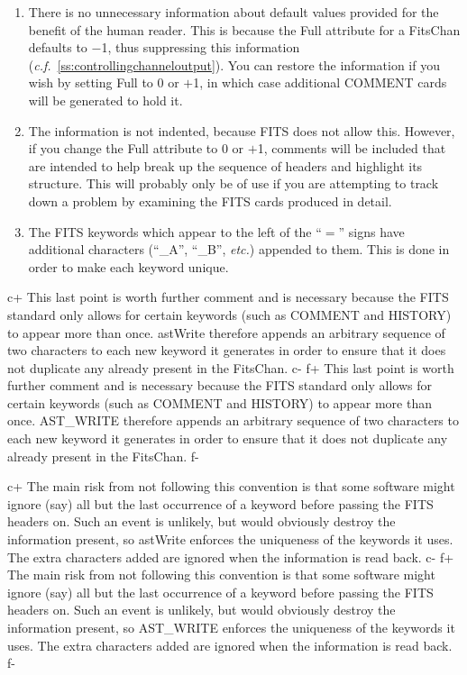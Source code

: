 \documentclass[twoside,11pt]{article}
\newcommand{\secref}[1]{\S\ref{#1}}
\renewcommand{\secref}[1]{\ref{#1}}
\begin{document}
\begin{enumerate}
\item There is no unnecessary information about default values
provided for the benefit of the human reader. This is because the Full
attribute for a FitsChan defaults to $-$1, thus suppressing this
information ({\em{c.f.}}~\secref{ss:controllingchanneloutput}). You
can restore the information if you wish by setting Full to 0 or $+$1,
in which case additional COMMENT cards will be generated to hold it.

\item The information is not indented, because FITS does not allow
this. However, if you change the Full attribute to 0 or $+$1, comments
will be included that are intended to help break up the sequence of
headers and highlight its structure. This will probably only be of use
if you are attempting to track down a problem by examining the FITS
cards produced in detail.

\item The FITS keywords which appear to the left of the ``$=$'' signs
have additional characters (``\_A'', ``\_B'', {\em{etc.}}) appended to
them. This is done in order to make each keyword unique.
\end{enumerate}

c+
This last point is worth further comment and is necessary because the
FITS standard only allows for certain keywords (such as COMMENT and
HISTORY) to appear more than once. astWrite therefore appends an
arbitrary sequence of two characters to each new keyword it generates
in order to ensure that it does not duplicate any already present in
the FitsChan.
c-
f+
This last point is worth further comment and is necessary because the
FITS standard only allows for certain keywords (such as COMMENT and
HISTORY) to appear more than once. AST\_WRITE therefore appends an
arbitrary sequence of two characters to each new keyword it generates
in order to ensure that it does not duplicate any already present in
the FitsChan.
f-

c+
The main risk from not following this convention is that some software
might ignore (say) all but the last occurrence of a keyword before
passing the FITS headers on. Such an event is unlikely, but would
obviously destroy the information present, so astWrite enforces the
uniqueness of the keywords it uses. The extra characters added are
ignored when the information is read back.
c-
f+
The main risk from not following this convention is that some software
might ignore (say) all but the last occurrence of a keyword before
passing the FITS headers on. Such an event is unlikely, but would
obviously destroy the information present, so AST\_WRITE enforces the
uniqueness of the keywords it uses. The extra characters added are
ignored when the information is read back.
f-
\end{document}
